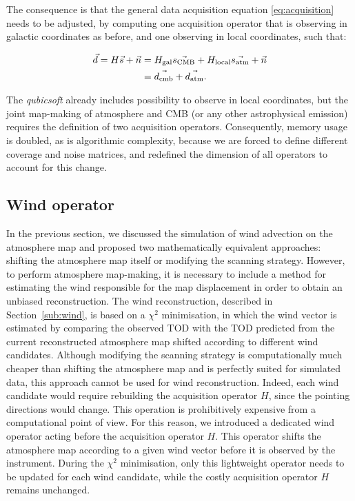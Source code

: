\documentclass[../../thesis.tex]{subfiles}
\begin{document}
The consequence is that the general data acquisition equation \ref{eq:acquisition} needs to be adjusted, by computing one acquisition operator that is observing in galactic coordinates as before, and one observing in local coordinates, such that: 

\begin{align}
    \vec{d} = H\vec{s} + \vec{n} &= H_\text{gal}\vec{s_\text{CMB}} + H_\text{local}\vec{s_\text{atm}} + \vec{n} \notag \\
    &= \vec{d_\text{cmb}} + \vec{d_\text{atm}}.
\end{align}

The \emph{qubicsoft} already includes possibility to observe in local coordinates, but the joint map-making of atmosphere and CMB (or any other astrophysical emission) requires the definition of two acquisition operators. Consequently, memory usage is doubled, as is algorithmic complexity, because we are forced to define different coverage and noise matrices, and redefined the dimension of all operators to account for this change.

\subsection{Wind operator} \label{sub:wind_operator}

In the previous section, we discussed the simulation of wind advection on the atmosphere map and proposed two mathematically equivalent approaches: shifting the atmosphere map itself or modifying the scanning strategy. However, to perform atmosphere map-making, it is necessary to include a method for estimating the wind responsible for the map displacement in order to obtain an unbiased reconstruction.
The wind reconstruction, described in Section~\ref{sub:wind}, is based on a $\chi^2$ minimisation, in which the wind vector is estimated by comparing the observed TOD with the TOD predicted from the current reconstructed atmosphere map shifted according to different wind candidates.
Although modifying the scanning strategy is computationally much cheaper than shifting the atmosphere map and is perfectly suited for simulated data, this approach cannot be used for wind reconstruction. Indeed, each wind candidate would require rebuilding the acquisition operator $H$, since the pointing directions would change. This operation is prohibitively expensive from a computational point of view.
For this reason, we introduced a dedicated wind operator acting before the acquisition operator $H$. This operator shifts the atmosphere map according to a given wind vector before it is observed by the instrument. During the $\chi^2$ minimisation, only this lightweight operator needs to be updated for each wind candidate, while the costly acquisition operator $H$ remains unchanged.
\end{document}
